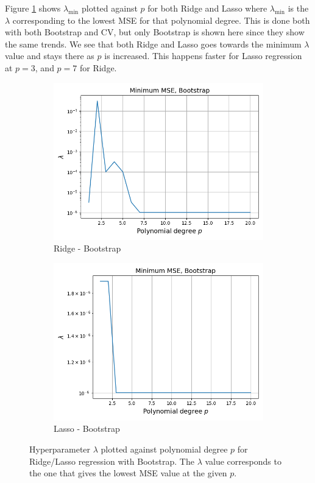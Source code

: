 \documentclass[a4paper]{article}
\begin{document}
Figure \ref{fig:terrain_lambdap} shows $\lambda_{\text{min}}$ plotted against $p$ for both Ridge and Lasso where $\lambda_{\text{min}}$ is the $\lambda$ corresponding to the lowest MSE for that polynomial degree. This is done both with both Bootstrap and CV, but only Bootstrap is shown here since they show the same trends. We see that both Ridge and Lasso goes towards the minimum $\lambda$ value and stays there as $p$ is increased. This happens faster for Lasso regression at $p=3$, and $p=7$ for Ridge.
\begin{figure}[H]
  \centering
  \begin{subfigure}{0.49\textwidth}
    \includegraphics[scale=0.45]{../figures/task_g/Ridge/degree_lambda_N22500_patch1_pmax20_nlamb15_Ridge_boot_Nbs264.png}
    \caption{Ridge - Bootstrap}
  \end{subfigure}
  \begin{subfigure}{0.49\textwidth}
    \includegraphics[scale=0.45]{../figures/task_g/Lasso/degree_lambda_N22500_patch1_pmax20_nlamb15_Lasso_boot_Nbs264.png}
    \caption{Lasso - Bootstrap}
  \end{subfigure}
  \caption{Hyperparameter $\lambda$ plotted against polynomial degree $p$ for Ridge/Lasso regression with Bootstrap. The $\lambda$ value corresponds to the one that gives the lowest MSE value at the given $p$.}
  \label{fig:terrain_lambdap}
\end{figure}
\end{document}
